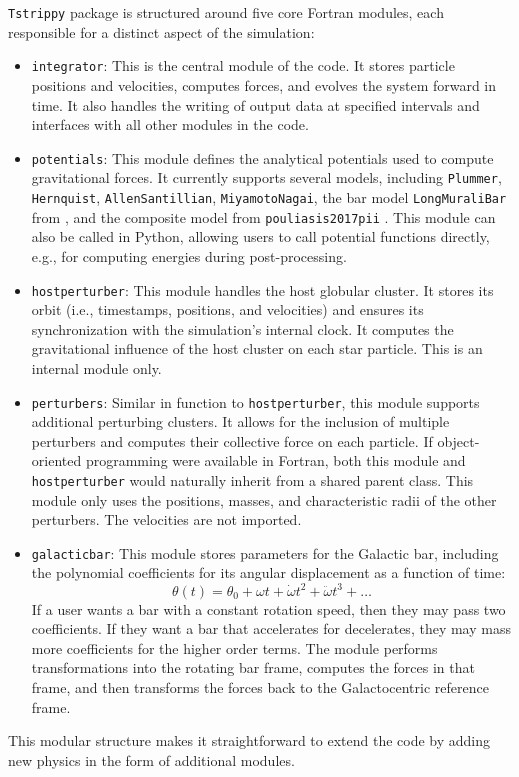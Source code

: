 \documentclass{article}
\begin{document}
    \texttt{Tstrippy} package is structured around five core Fortran modules, each responsible for a distinct aspect of the simulation:
    \begin{itemize}
        \item \texttt{integrator}: This is the central module of the code. It stores particle positions and velocities, computes forces, and evolves the system forward in time. It also handles the writing of output data at specified intervals and interfaces with all other modules in the code.
        \item \texttt{potentials}: This module defines the analytical potentials used to compute gravitational forces. It currently supports several models, including \texttt{Plummer}, \texttt{Hernquist}, \texttt{AllenSantillian}, \texttt{MiyamotoNagai}, the bar model \texttt{LongMuraliBar} from \citet{1992ApJ...397...44L}, and the composite model from \texttt{pouliasis2017pii} \citep{2017A&A...598A..66P}. This module can also be called in Python, allowing users to call potential functions directly, e.g., for computing energies during post-processing.
        \item \texttt{hostperturber}: This module handles the host globular cluster. It stores its orbit (i.e., timestamps, positions, and velocities) and ensures its synchronization with the simulation's internal clock. It computes the gravitational influence of the host cluster on each star particle. This is an internal module only.
        \item \texttt{perturbers}: Similar in function to \texttt{hostperturber}, this module supports additional perturbing clusters. It allows for the inclusion of multiple perturbers and computes their collective force on each particle. If object-oriented programming were available in Fortran, both this module and \texttt{hostperturber} would naturally inherit from a shared parent class. This module only uses the positions, masses, and characteristic radii of the other perturbers. The velocities are not imported.
        \item \texttt{galacticbar}: This module stores parameters for the Galactic bar, including the polynomial coefficients for its angular displacement as a function of time:
        \[
        \theta(t) = \theta_0 + \omega t + \dot{\omega} t^2 + \ddot{\omega} t^3 + \dots
        \]
        If a user wants a bar with a constant rotation speed, then they may pass two coefficients. If they want a bar that accelerates for decelerates, they may mass more coefficients for the higher order terms. The module performs transformations into the rotating bar frame, computes the forces in that frame, and then transforms the forces back to the Galactocentric reference frame.
    \end{itemize}
    This modular structure makes it straightforward to extend the code by adding new physics in the form of additional modules.
\end{document}
